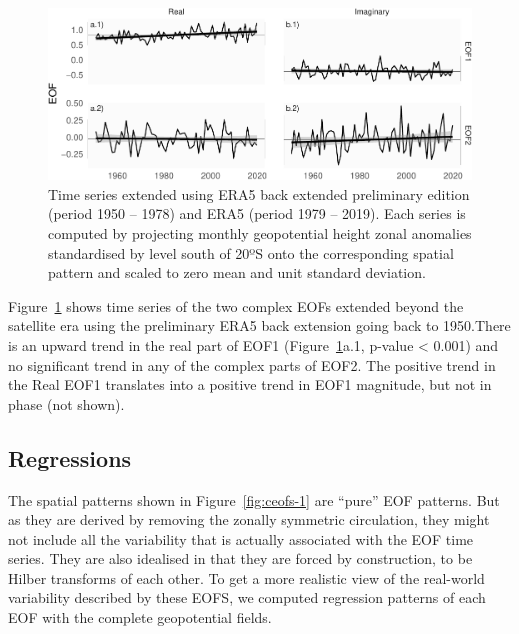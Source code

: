 \documentclass[smallextended]{svjour3}       %
\begin{document}
\begin{figure}
\includegraphics{../figures/extended-series-1} \caption{Time series extended using ERA5 back extended preliminary edition (period 1950 -- 1978) and ERA5 (period 1979 -- 2019). Each series is computed by projecting monthly geopotential height zonal anomalies standardised by level south of 20ºS onto the corresponding spatial pattern and scaled to zero mean and unit standard deviation.}\label{fig:extended-series}
\end{figure}

Figure~\ref{fig:extended-series} shows time series of the two complex EOFs extended beyond the satellite era using the preliminary ERA5 back extension going back to 1950.There is an upward trend in the real part of EOF1 (Figure~\ref{fig:extended-series}a.1, p-value \textless{} 0.001) and no significant trend in any of the complex parts of EOF2. The positive trend in the Real EOF1 translates into a positive trend in EOF1 magnitude, but not in phase (not shown).

\hypertarget{regressions}{%
\subsection{Regressions}\label{regressions}}

The spatial patterns shown in Figure~\ref{fig:ceofs-1} are ``pure'' EOF patterns. But as they are derived by removing the zonally symmetric circulation, they might not include all the variability that is actually associated with the EOF time series. They are also idealised in that they are forced by construction, to be Hilber transforms of each other. To get a more realistic view of the real-world variability described by these EOFS, we computed regression patterns of each EOF with the complete geopotential fields.
\end{document}
